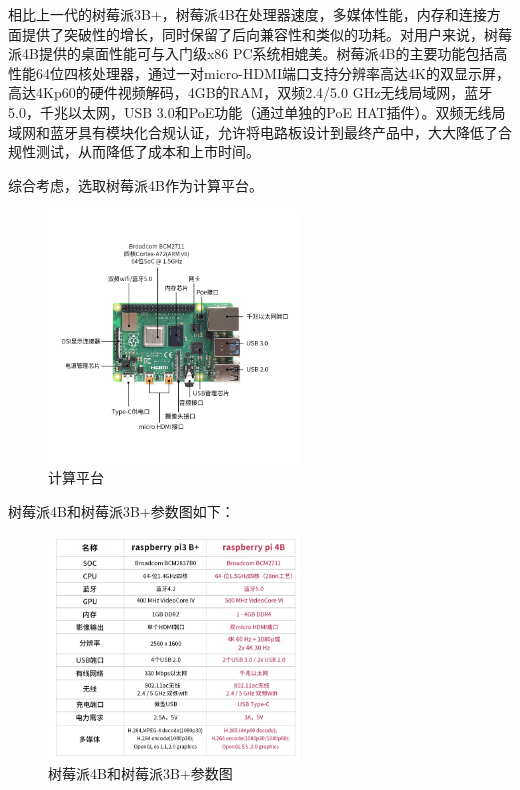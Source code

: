 \documentclass[10pt]{ctexart}
\begin{document}
相比上一代的树莓派3B+，树莓派4B在处理器速度，多媒体性能，内存和连接方面提供了突破性的增长，同时保留了后向兼容性和类似的功耗。对用户来说，树莓派4B提供的桌面性能可与入门级x86 PC系统相媲美。树莓派4B的主要功能包括高性能64位四核处理器，通过一对micro-HDMI端口支持分辨率高达4K的双显示屏，高达4Kp60的硬件视频解码，4GB的RAM，双频2.4/5.0 GHz无线局域网，蓝牙5.0，千兆以太网，USB 3.0和PoE功能（通过单独的PoE HAT插件）。双频无线局域网和蓝牙具有模块化合规认证，允许将电路板设计到最终产品中，大大降低了合规性测试，从而降低了成本和上市时间。

综合考虑，选取树莓派4B作为计算平台。

\begin{figure}[H]
    \centering
    \includegraphics[width=0.6\textwidth]{raspberrypi/raspberry_pi.png}
    \caption{计算平台}
    \label{fig:raspberry_pi}
\end{figure}

树莓派4B和树莓派3B+参数图如下：

\begin{figure}[H]
    \centering
    \includegraphics[width=0.6\textwidth]{raspberrypi/raspberry_pi_parameter.png}
    \caption{树莓派4B和树莓派3B+参数图}
    \label{fig:raspberry_pi_parameter}
\end{figure}
\end{document}
